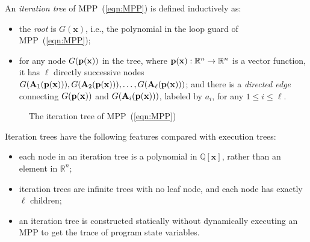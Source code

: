 \documentclass{jssc}
\newcommand{\xx}{\mathbf{x}}
\begin{document}
\begin{definition}\label{dfn:it-tree}
An \emph{iteration tree} of MPP~(\ref{eqn:MPP}) is defined inductively as:
\begin{itemize}
\item the \emph{root} is $G(\xx)$, i.e., the polynomial in the loop guard of MPP~(\ref{eqn:MPP});
\item for any node $G({\bf p}(\xx))$ in the tree, where ${\bf p}(\xx): \mathbb{R}^n \rightarrow \mathbb{R}^n$ is a vector function, it has $\ell$ directly successive nodes $G({\bf A}_1({\bf p}(\xx))),G({\bf A}_2({\bf p}(\xx))),\ldots,G({\bf A}_{\ell} ({\bf p}(\xx)))$; and there is a \emph{directed edge} connecting $G({\bf p}(\xx))$ and $G({\bf A}_i ({\bf p}(\xx)))$, labeled by $a_i$, for any $1 \leq i \leq \ell$.
\end{itemize}
\end{definition}

\begin{figure}
\caption{\small The iteration tree of MPP~(\ref{eqn:MPP})}\label{fig:it-tree}
\end{figure}

\begin{remark}
Iteration trees have the following features compared with execution trees:
\begin{itemize}
\item each node in an iteration tree is a polynomial in $\mathbb{Q}[\xx]$, rather than an element in $\mathbb{R}^n$;
\item iteration trees are infinite trees with no leaf node, and each node has exactly $\ell$ children;
\item an iteration tree is constructed statically without dynamically executing an MPP to get the trace of program state variables.
\end{itemize}
\end{remark}
\end{document}
